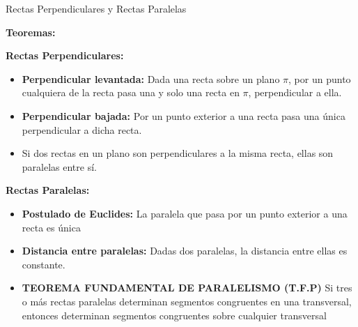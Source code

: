\documentclass[•]{article}
\begin{document}
\begin{center}
\Large{Rectas Perpendiculares y Rectas Paralelas}
\end{center}



\begin{flushleft}
\textbf{Teoremas:}
\end{flushleft}

\begin{flushleft}
\textbf{Rectas Perpendiculares:}
\begin{itemize}
	
	\item \textbf{Perpendicular levantada: } Dada una recta sobre un plano $\pi$, por un punto cualquiera de la recta pasa una y solo una recta en $\pi$, perpendicular a ella.
	\item \textbf{Perpendicular bajada: } Por un punto exterior a una recta pasa una \'unica perpendicular a dicha recta.
	\item Si dos rectas en un plano son perpendiculares a la misma recta, ellas son paralelas entre s\'i.
	

\end{itemize}
\end{flushleft}

\begin{flushleft}
\textbf{Rectas Paralelas:}
\begin{itemize}
\item \textbf{Postulado de Euclides: }La paralela que pasa por un punto exterior a una recta es \'unica
\item \textbf{Distancia entre paralelas: } Dadas dos paralelas, la distancia entre ellas es constante.

\item \textbf{TEOREMA FUNDAMENTAL DE PARALELISMO (T.F.P)} Si tres o m\'as rectas paralelas determinan segmentos congruentes en una transversal, entonces determinan segmentos congruentes sobre cualquier transversal
\end{itemize}
\end{flushleft}
\end{document}
